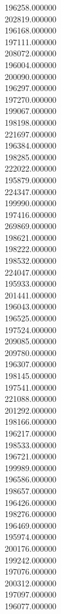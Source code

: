 196258.000000\\
202819.000000\\
196168.000000\\
197111.000000\\
208072.000000\\
196004.000000\\
200090.000000\\
196297.000000\\
197270.000000\\
199067.000000\\
198198.000000\\
221697.000000\\
196384.000000\\
198285.000000\\
222022.000000\\
195879.000000\\
224347.000000\\
199990.000000\\
197416.000000\\
269869.000000\\
198621.000000\\
198222.000000\\
198532.000000\\
224047.000000\\
195933.000000\\
201441.000000\\
196043.000000\\
196525.000000\\
197524.000000\\
209085.000000\\
209780.000000\\
196307.000000\\
198145.000000\\
197541.000000\\
221088.000000\\
201292.000000\\
198166.000000\\
196217.000000\\
198533.000000\\
196721.000000\\
199989.000000\\
196586.000000\\
198657.000000\\
196426.000000\\
198276.000000\\
196469.000000\\
195974.000000\\
200176.000000\\
199242.000000\\
197076.000000\\
200312.000000\\
197097.000000\\
196077.000000\\
